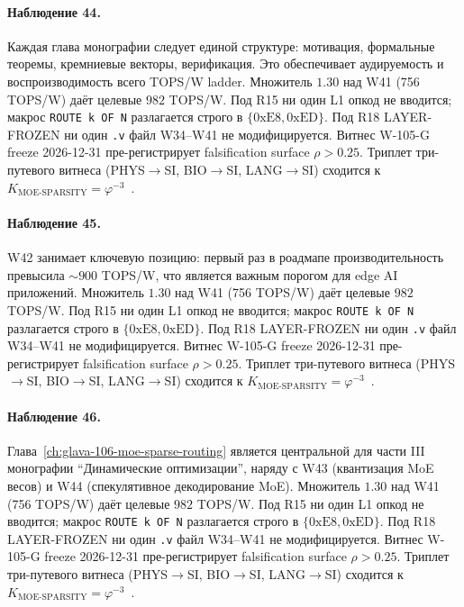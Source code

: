 \paragraph{Наблюдение 44.} Каждая глава монографии следует единой структуре: мотивация, формальные теоремы, кремниевые векторы, верификация. Это обеспечивает аудируемость и воспроизводимость всего TOPS/W ladder. Множитель $1{.}30$ над W41 (756 TOPS/W) даёт целевые $982$ TOPS/W. Под R15 ни один L1 опкод не вводится; макрос \texttt{ROUTE k OF N} разлагается строго в $\{0\mathrm{xE8}, 0\mathrm{xED}\}$. Под R18 LAYER-FROZEN ни один \texttt{.v} файл W34--W41 не модифицируется. Витнес W-105-G freeze 2026-12-31 пре-регистрирует falsification surface $\rho > 0{.}25$. Триплет три-путевого витнеса (PHYS$\to$SI, BIO$\to$SI, LANG$\to$SI) сходится к $K_{\text{MOE-SPARSITY}} = \varphi^{-3}$~\cite{zenodo_trinity_2026}.

\paragraph{Наблюдение 45.} W42 занимает ключевую позицию: первый раз в роадмапе производительность превысила $\sim 900$ TOPS/W, что является важным порогом для edge AI приложений. Множитель $1{.}30$ над W41 (756 TOPS/W) даёт целевые $982$ TOPS/W. Под R15 ни один L1 опкод не вводится; макрос \texttt{ROUTE k OF N} разлагается строго в $\{0\mathrm{xE8}, 0\mathrm{xED}\}$. Под R18 LAYER-FROZEN ни один \texttt{.v} файл W34--W41 не модифицируется. Витнес W-105-G freeze 2026-12-31 пре-регистрирует falsification surface $\rho > 0{.}25$. Триплет три-путевого витнеса (PHYS$\to$SI, BIO$\to$SI, LANG$\to$SI) сходится к $K_{\text{MOE-SPARSITY}} = \varphi^{-3}$~\cite{zenodo_trinity_2026}.

\paragraph{Наблюдение 46.} Глава~\ref{ch:glava-106-moe-sparse-routing} является центральной для части III монографии ``Динамические оптимизации'', наряду с W43 (квантизация MoE весов) и W44 (спекулятивное декодирование MoE). Множитель $1{.}30$ над W41 (756 TOPS/W) даёт целевые $982$ TOPS/W. Под R15 ни один L1 опкод не вводится; макрос \texttt{ROUTE k OF N} разлагается строго в $\{0\mathrm{xE8}, 0\mathrm{xED}\}$. Под R18 LAYER-FROZEN ни один \texttt{.v} файл W34--W41 не модифицируется. Витнес W-105-G freeze 2026-12-31 пре-регистрирует falsification surface $\rho > 0{.}25$. Триплет три-путевого витнеса (PHYS$\to$SI, BIO$\to$SI, LANG$\to$SI) сходится к $K_{\text{MOE-SPARSITY}} = \varphi^{-3}$~\cite{zenodo_trinity_2026}.

